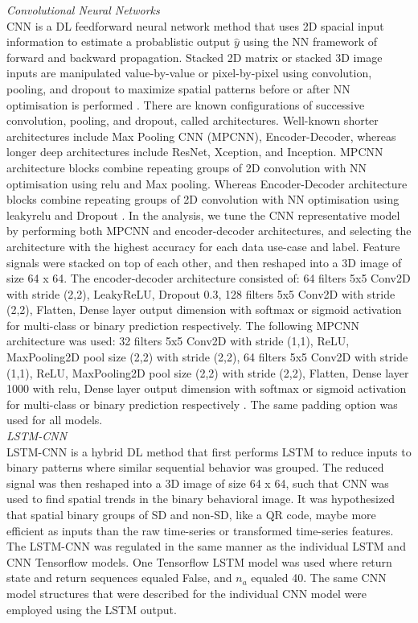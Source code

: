 \documentclass{ieeeaccess}
\begin{document}
\noindent \emph{Convolutional Neural Networks}\\
CNN is a DL feedforward neural network method that uses 2D spacial input information to estimate a probablistic output $\hat{y}$ using the NN framework of forward and backward propagation. Stacked 2D matrix or stacked 3D image inputs are manipulated value-by-value or pixel-by-pixel using convolution, pooling, and dropout to maximize spatial patterns before or after NN optimisation is performed \cite{Burkov_2019_ML, Ng_2021_Deep_learning_specialization}. There are known configurations of successive convolution, pooling, and dropout, called architectures. Well-known shorter architectures include Max Pooling CNN (MPCNN), Encoder-Decoder, whereas longer deep architectures include ResNet, Xception, and Inception. MPCNN architecture blocks combine repeating groups of 2D convolution with NN optimisation using relu and Max pooling. Whereas Encoder-Decoder architecture blocks combine repeating groups of 2D convolution with NN optimisation using leakyrelu and Dropout \cite{}. In the analysis, we tune the CNN representative model by performing both MPCNN and encoder-decoder architectures, and selecting the architecture with the highest accuracy for each data use-case and label. Feature signals were stacked on top of each other, and then reshaped into a 3D image of size 64 x 64. The encoder-decoder architecture consisted of: 64 filters 5x5 Conv2D with stride (2,2), LeakyReLU, Dropout 0.3, 128 filters 5x5 Conv2D with stride (2,2), Flatten, Dense layer output dimension with softmax or sigmoid activation for multi-class or binary prediction respectively. The following MPCNN architecture was used: 32 filters 5x5 Conv2D with stride (1,1), ReLU, MaxPooling2D pool size (2,2) with stride (2,2), 64 filters 5x5 Conv2D with stride (1,1), ReLU, MaxPooling2D pool size (2,2) with stride (2,2), Flatten, Dense layer 1000 with relu, Dense layer output dimension with softmax or sigmoid activation for multi-class or binary prediction respectively \cite{Nedorubova_2021_CWT_CNN_HumanActivity}. The same padding option was used for all models.\\


\noindent \emph{LSTM-CNN}\\
LSTM-CNN is a hybrid DL method that first performs LSTM to reduce inputs to binary patterns where similar sequential behavior was grouped. The reduced signal was then reshaped into a 3D image of size 64 x 64, such that CNN was used to find spatial trends in the binary behavioral image. It was hypothesized that spatial binary groups of SD and non-SD, like a QR code, maybe more efficient as inputs than the raw time-series or transformed time-series features. The LSTM-CNN was regulated in the same manner as the individual LSTM and CNN Tensorflow models. One Tensorflow LSTM model was used where return state and return sequences equaled False, and $n_a$ equaled 40. The same CNN model structures that were described for the individual CNN model were employed using the LSTM output.\\
\end{document}
